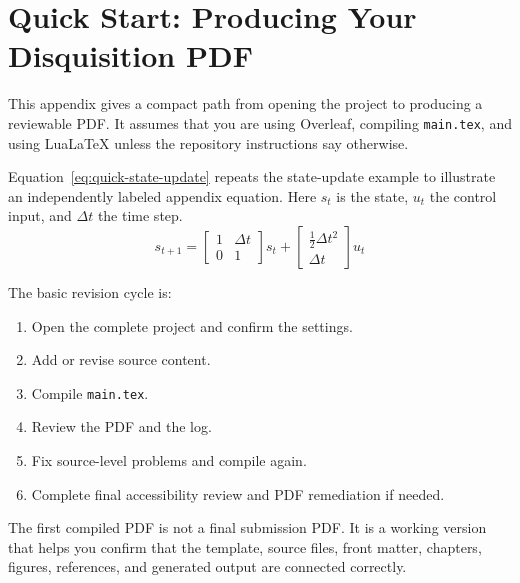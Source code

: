 \chapter{Quick Start: Producing Your Disquisition PDF}
\label{app:quick-start}

This appendix gives a compact path from opening the project to producing a reviewable PDF. It assumes that you are using Overleaf, compiling \texttt{main.tex}, and using LuaLaTeX unless the repository instructions say otherwise.

Equation~\ref{eq:quick-state-update} repeats the state-update example to illustrate an independently labeled appendix equation. Here \(s_t\) is the state, \(u_t\) the control input, and \(\Delta t\) the time step.
\begin{equation}
      s_{t+1}
    =
    \begin{bmatrix}
      1 & \Delta t \\
      0 & 1
    \end{bmatrix}
    s_t
    +
    \begin{bmatrix}
      \frac{1}{2}\Delta t^2 \\
      \Delta t
    \end{bmatrix}
    u_t
\label{eq:quick-state-update}
\end{equation}

The basic revision cycle is:

\begin{enumerate}
    \item Open the complete project and confirm the settings.
    \item Add or revise source content.
    \item Compile \texttt{main.tex}.
    \item Review the PDF and the log.
    \item Fix source-level problems and compile again.
    \item Complete final accessibility review and PDF remediation if needed.
\end{enumerate}

The first compiled PDF is not a final submission PDF. It is a working version that helps you confirm that the template, source files, front matter, chapters, figures, references, and generated output are connected correctly.

